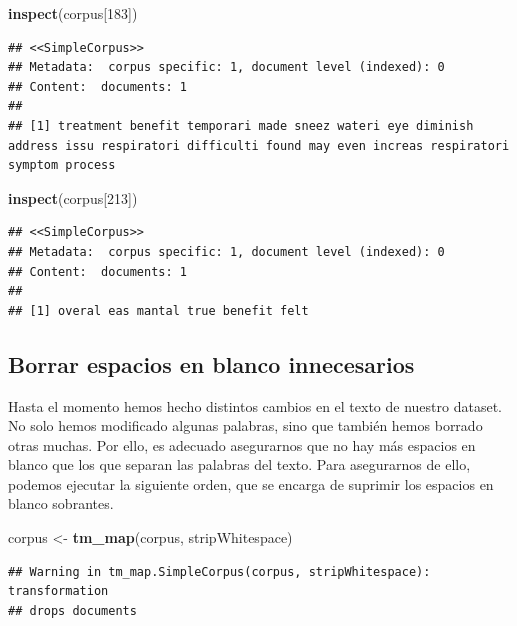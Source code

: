 \documentclass[spanish,]{article}
\newenvironment{Shaded}{\begin{snugshade}}{\end{snugshade}}
\newcommand{\KeywordTok}[1]{\textcolor[rgb]{0.13,0.29,0.53}{\textbf{#1}}}
\newcommand{\DecValTok}[1]{\textcolor[rgb]{0.00,0.00,0.81}{#1}}
\newcommand{\StringTok}[1]{\textcolor[rgb]{0.31,0.60,0.02}{#1}}
\newcommand{\NormalTok}[1]{#1}
\begin{document}
\begin{Shaded}
\begin{Highlighting}[]
\KeywordTok{inspect}\NormalTok{(corpus[}\DecValTok{183}\NormalTok{])}
\end{Highlighting}
\end{Shaded}

\begin{verbatim}
## <<SimpleCorpus>>
## Metadata:  corpus specific: 1, document level (indexed): 0
## Content:  documents: 1
## 
## [1] treatment benefit temporari made sneez wateri eye diminish address issu respiratori difficulti found may even increas respiratori symptom process
\end{verbatim}

\begin{Shaded}
\begin{Highlighting}[]
\KeywordTok{inspect}\NormalTok{(corpus[}\DecValTok{213}\NormalTok{])}
\end{Highlighting}
\end{Shaded}

\begin{verbatim}
## <<SimpleCorpus>>
## Metadata:  corpus specific: 1, document level (indexed): 0
## Content:  documents: 1
## 
## [1] overal eas mantal true benefit felt
\end{verbatim}

\subsection{Borrar espacios en blanco
innecesarios}\label{borrar-espacios-en-blanco-innecesarios}

Hasta el momento hemos hecho distintos cambios en el texto de nuestro
dataset. No solo hemos modificado algunas palabras, sino que también
hemos borrado otras muchas. Por ello, es adecuado asegurarnos que no hay
más espacios en blanco que los que separan las palabras del texto. Para
asegurarnos de ello, podemos ejecutar la siguiente orden, que se encarga
de suprimir los espacios en blanco sobrantes.

\begin{Shaded}
\begin{Highlighting}[]
\NormalTok{corpus <-}\StringTok{ }\KeywordTok{tm_map}\NormalTok{(corpus, stripWhitespace) }
\end{Highlighting}
\end{Shaded}

\begin{verbatim}
## Warning in tm_map.SimpleCorpus(corpus, stripWhitespace): transformation
## drops documents
\end{verbatim}
\end{document}
